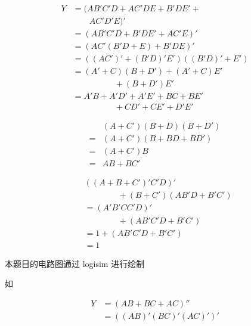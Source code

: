 \documentclass[lang=cn,11pt,a4paper,cite=authoryear,twocolumn]{elegantpaper}
\begin{document}

\[\begin{aligned}
    Y &= (AB'C'D + AC'DE + B'DE' + \\
    &\quad\quad AC'D'E)' \\ 
    &= (AB'C'D + B'DE' + AC'E)' \\
    &= (AC'(B'D + E) + B'DE)' \\ 
    &= ((AC')' + (B'D)' E') ((B'D)' + E') \\
    &= (A'+C)(B+D') + (A'+C)E'\\
    &\quad\quad\quad\quad\quad  + (B+D')E' \\
    &= A'B + A'D' + A'E' + BC + BE' \\
    &\quad\quad\quad\quad\quad + CD'  + CE' + D'E'
\end{aligned}\]



\[
\begin{aligned}
&(A+C')(B+D)(B+D') \\
=&(A+C')(B+BD+BD') \\ 
=&(A+C')B \\
=&AB+BC'
\end{aligned}    
\]


\[\begin{aligned}
&((A+B+C')'C'D)'\\
& \quad\quad\quad\quad +(B+C')(AB'D+B'C')\\
&= (A'B'CC'D)' \\
& \quad\quad\quad\quad +(AB'C'D+B'C')\\
&= 1 +(AB'C'D+B'C') \\
&= 1 
\end{aligned}\]


本题目的电路图通过 logisim 进行绘制


如

\[\begin{aligned}
Y &= (AB+BC+AC)'' \\
&= ((AB)' (BC)' (AC)')' \\
\end{aligned}\]

\end{document}
